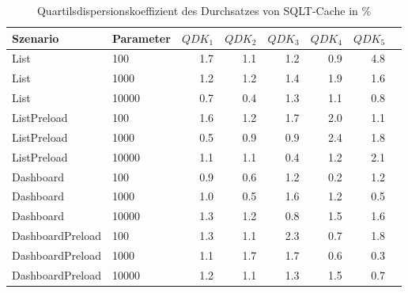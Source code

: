 
\begin{table}[ht]
\setlength{\extrarowheight}{-1pt}
\centering
\caption{Quartilsdispersionskoeffizient des Durchsatzes von SQLT-Cache in \%}
\begin{tabular}{llrrrrrr}
\toprule
Szenario & Parameter & ${QDK_1}$ & ${QDK_2}$ & ${QDK_3}$& ${QDK_4}$ & ${QDK_5}$ \\
\midrule
	List & 100 &  1.7 &  1.1 &  1.2 &  0.9 & \cellcolor{red!12}  4.8 \\
	List & 1000 &  1.2 &  1.2 &  1.4 &  1.9 &  1.6 \\
	List & 10000 &  0.7 &  0.4 &  1.3 &  1.1 &  0.8 \\
	ListPreload & 100 &  1.6 &  1.2 &  1.7 & \cellcolor{red!11}  2.0 &  1.1 \\
	ListPreload & 1000 &  0.5 &  0.9 &  0.9 & \cellcolor{red!11}  2.4 &  1.8 \\
	ListPreload & 10000 &  1.1 &  1.1 &  0.4 &  1.2 & \cellcolor{red!11}  2.1 \\
	Dashboard & 100 &  0.9 &  0.6 &  1.2 &  0.2 &  1.2 \\
	Dashboard & 1000 &  1.0 &  0.5 &  1.6 &  1.2 &  0.5 \\
	Dashboard & 10000 &  1.3 &  1.2 &  0.8 &  1.5 &  1.6 \\
	DashboardPreload & 100 &  1.3 &  1.1 & \cellcolor{red!11}  2.3 &  0.7 &  1.8 \\
	DashboardPreload & 1000 &  1.1 &  1.7 &  1.7 &  0.6 &  0.3 \\
	DashboardPreload & 10000 &  1.2 &  1.1 &  1.3 &  1.5 &  0.7 \\
\bottomrule
\end{tabular}
\label{tab:quartilsdispersionskoeffizient_durchsatz_sqltcache}
\end{table}
	